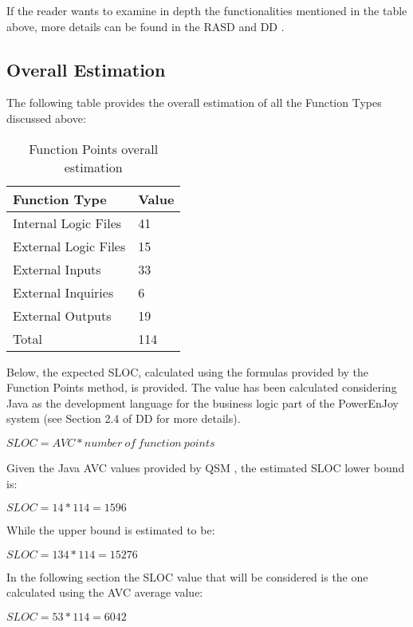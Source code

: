 If the reader wants to examine in depth the functionalities mentioned in the table above, more details can be found in the RASD \cite{rasd} and DD \cite{dd}.

\newpage
\subsection{Overall Estimation}
The following table provides the overall estimation of all the Function Types discussed above:

\begin{table}[H]
	\centering
	\caption{Function Points overall estimation}
	\label{tab:overall_fps}
	\begin{tabular}{|l|l|}
		\hline
		Function Type		&	Value	\\ \hline
		Internal Logic Files	&	41	\\
		External Logic Files	&	15	\\ 
		External Inputs			&	33	\\ 
		External Inquiries		&	6	\\ 
		External Outputs		&	19	\\ \hline
		Total					&	114	\\
		\hline
	\end{tabular}
\end{table}

Below, the expected SLOC, calculated using the formulas provided by the Function Points method, is provided. The value has been calculated considering Java as the development language for the business logic part of the PowerEnJoy system (see Section 2.4 of DD \cite{dd} for more details).

\begin{center}
$SLOC = AVC * number \ of \ function \ points$
\end{center}
Given the Java AVC values provided by QSM \cite{avc_qsm}, the estimated SLOC lower bound is:
\begin{center}
$SLOC = 14 * 114 = 1596$
\end{center}
While the upper bound is estimated to be:
\begin{center}
$SLOC = 134 * 114 = 15276$
\end{center}
In the following section the SLOC value that will be considered is the one calculated using the AVC average value:
\begin{center}
$SLOC = 53 * 114 = 6042$
\end{center}
\newpage
